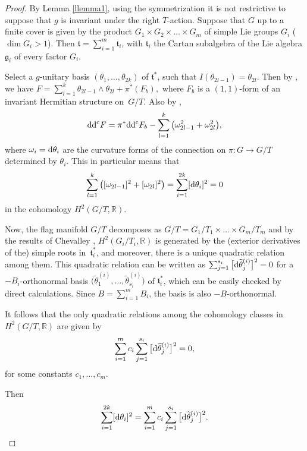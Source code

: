 \documentclass[pdftex]{sigma}
\numberwithin{equation}{section}
\begin{document}
\begin{proof} By Lemma \ref{llemma1}, using the symmetrization it is not restrictive to suppose that $g$ is invariant under the right $T$-action.
 Suppose that $G$ up to a finite cover is given by the product $G_1\times G_2\times \dots \times G_m$ of simple Lie groups $G_i$ ($ \dim G_i > 1$). Then $\mathfrak t = \sum_{i = 1}^m \mathfrak t_i$, with $\mathfrak t_i$ the Cartan subalgebra of the Lie algebra $\mathfrak g_i$ of every factor $G_i$.


Select a $g$-unitary basis $(\theta_1, \dots , \theta_{2k})$ of $\mathfrak t^*$, such that $ I(\theta_{2l-1})=\theta_{2l}$.
Then by \cite{GGP}, we have $F = \sum_{l = 1}^k \theta_{2l-1}\wedge\theta_{2l} + \pi^*(F_b),$ where $F_b$ is a $(1,1)$-form of an invariant Hermitian structure on~$G/T$. Also by \cite[Section~5]{GGP},
\[
{\rm d}{\rm d}^{\rm c} F = \pi^*{\rm d}{\rm d}^{\rm c} F_b - \sum_{l = 1}^k \big(\omega_{2l-1}^2+\omega_{2l}^2\big),
\]
 where $\omega_i = {\rm d}\theta_i$ are the curvature forms of the connection on $\pi\colon G\rightarrow G/T$ determined by $\theta_i$. This in particular means that
 \[
 \sum_{l=1}^k \big([\omega_{2l-1}]^2+[\omega_{2l}]^2\big) = \sum_{i=1}^{2k} [{\rm d}\theta_i]^2 = 0
 \]
 in the cohomology $H^2(G/T, \mathbb{R})$.

Now, the flag manifold $G/T$ decomposes as $G/T = G_1/T_1\times\dots \times G_m/T_m$ and by the results of Chevalley \cite{Chevalley}, $H^2(G_i/T_i, \mathbb{R})$ is generated by the (exterior derivatives of the) simple roots in~$\mathfrak t_i^*$, and moreover, there is a unique quadratic relation among them. This quadratic relation can be written as $\sum_{j=1}^{s_i} \big[{\rm d}\widetilde{\theta}^{(i)}_j\big]^2 = 0$ for
a $-B_i$-orthonormal basis $\big(\widetilde{\theta}^{(i)}_1, \dots, \widetilde{\theta}^{(i)}_{s_i}\big)$ of $\mathfrak t_i^*$, which can be easily checked by direct calculations. Since $B =\sum_{i =1}^m B_i$, the basis is also $-B$-orthonormal.

It follows that the only quadratic relations among the cohomology classes in $H^2(G/T, \mathbb{R})$ are given by
\begin{equation}\label{quadraticrel}
 \sum_{i=1}^m c_i\sum_{j=1}^{s_i} \big[{\rm d}\widetilde{\theta}^{(i)}_j\big]^2 = 0, \end{equation} for some constants $c_1, \dots, c_m$.

Then
\begin{equation} \label{quadrelation}
\sum_{i=1}^{2k} [{\rm d}\theta_i]^2 = \sum_{i=1}^m c_i\sum_{j=1}^{s_i} \big[{\rm d}\widetilde{\theta}^{(i)}_j\big]^2.
\end{equation}


\end{proof}
\end{document}
